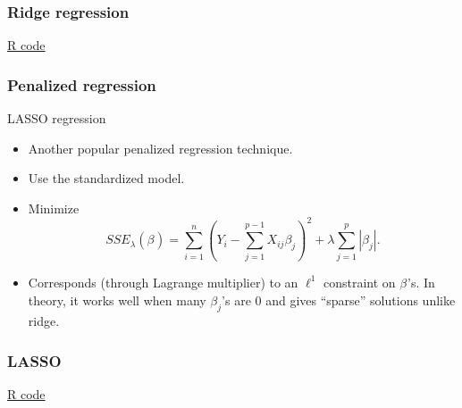 \documentclass[handout]{beamer}
\newcommand{\B}[1]{\beta_{#1}}
\begin{document}


   \begin{frame}
   \frametitle{Ridge regression}
   \begin{center}
   \end{center}
   \href{http://www.stanford.edu/class/stats191/penalized.html#ridge-regression}{R code}
   \end{frame}


   \begin{frame} \frametitle{Penalized regression}

   \begin{block}
    {LASSO regression}
        \begin{itemize}
        \item Another popular penalized regression technique.

        \item Use the standardized model.
        \item Minimize
    $$
    SSE_{\lambda}(\B{}) = \sum_{i=1}^n \left(Y_i - \sum_{j=1}^{p-1} X_{ij} \B{j}\right)^2 + \lambda \sum_{j=1}^p |\B{j}|.$$

    \item Corresponds (through Lagrange multiplier) to an $\ell^1$ constraint on $\B{}$'s. In theory, it works well when many $\B{j}$'s are 0 and gives ``sparse'' solutions unlike ridge.

        \end{itemize}

   \end{block}
   \end{frame}



   \begin{frame}
   \frametitle{LASSO}
   \begin{center}
   \end{center}
   \href{http://www.stanford.edu/class/stats191/penalized.html#lasso}{R code}
   \end{frame}
\end{document}
